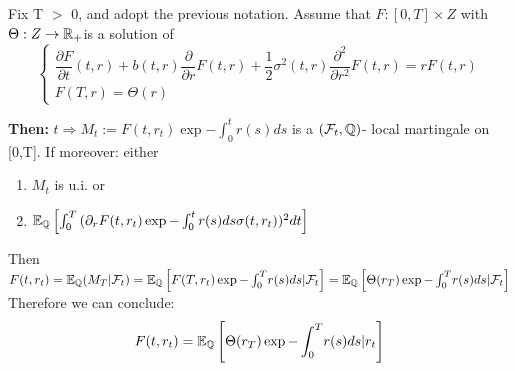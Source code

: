\begin{thm}
 Fix T $\gt$ 0, and adopt the previous notation. Assume that
$F:[0,T] \times Z$ with $\Theta: Z \rightarrow \mathbb{R}_{+}$is a solution of 
\begin{equation}\label{pde}
\begin{cases}
 \dfrac{\partial F}{\partial t} (t,r) + b(t,r) \dfrac{\partial}{\partial r} F(t,r) + \dfrac{1}{2} \sigma^{2}
(t,r) \dfrac{\partial^{2}}{\partial r^{2}} F(t,r) = rF(t,r) \\
F(T,r) = \Theta(r)
\end{cases}
\end{equation}

\textbf{Then:} $t \Rightarrow M_{t}:= F(t,r_{t})\exp{-\int_{0}^{t}r(s)ds}$ is a $(\mathcal{F}_t, \mathbb{Q})$- local martingale
on [0,T]. If moreover: 
either 

\begin{enumerate}\label{check}
 \item $M_t$ is u.i. or 
\item $\mathbb{E}_{\mathbb{Q}}\left[ \int_0^T 
\left(\partial_{r} F(t, r_{t}\right)\exp{-\int_{0}^{t}r(s)ds}\sigma(t, r_{t}))^{2}dt\right]$

\end{enumerate}

Then $F(t, r_{t}) = \mathbb{E}_{\mathbb{Q}}(M_{T} | \mathcal{F}_t) = \mathbb{E}_{\mathbb{Q}} \left[F(T,r_{t})
\exp{-\int_{0}^{T}} r(s) ds |\mathcal{F}_t\right]= \mathbb{E}_{\mathbb{Q}} \left[\Theta(r_{T}) 
\exp{-\int_{0}^{T}} r(s) ds |\mathcal{F}_{t}\right]$
Therefore we can conclude: 
\begin{displaymath}
F(t, r_{t}) = \mathbb{E}_{\mathbb{Q}} \left[\Theta(r_{T}) 
\exp{-\int_{0}^{T}} r(s) ds |r_{t}\right]
\end{displaymath}
\end{thm}
